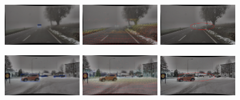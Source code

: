 \documentclass[report.tex]{subfiles}
\begin{document}
\begin{figure}[ht!]
            \includegraphics[width=0.3\textwidth]{images/datasets/dense/samples/dense_fog/2018-10-29_15-02-37_00580.png}\hfill
            \includegraphics[width=0.3\textwidth]{images/datasets/dense/samples/dense_fog/dense_lidar.png}\hfill
            \includegraphics[width=0.3\textwidth]{images/datasets/dense/samples/dense_fog/dense_radar_ann.png}
          
            \includegraphics[width=0.3\textwidth]{images/datasets/dense/samples/snow/2018-02-07_11-56-57_00520.png}\hfill
            \includegraphics[width=0.3\textwidth]{images/datasets/dense/samples/snow/snow_lidar.png}\hfill
            \includegraphics[width=0.3\textwidth]{images/datasets/dense/samples/snow/snow_radar_ann.png}
          

\end{figure}
\end{document}
